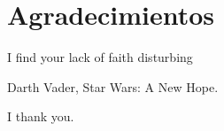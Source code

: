 %
%
%
%
%
%
%
%
%
%
%
%
%

\chapter{Agradecimientos}


\begin{FraseCelebre}
\begin{Frase}
I find your lack of faith disturbing\end{Frase}
\begin{Fuente}
Darth Vader, Star Wars: A New Hope.
\end{Fuente}
\end{FraseCelebre}

I thank you.

\endinput
